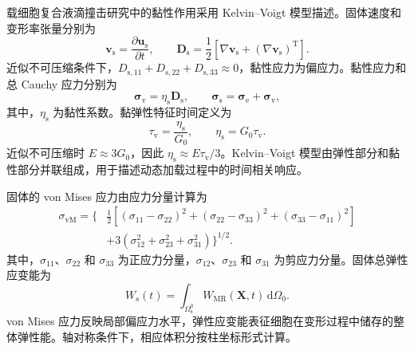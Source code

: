 载细胞复合液滴撞击研究中的黏性作用采用 Kelvin--Voigt 模型描述。固体速度和变形率张量分别为
\begin{equation}
\boldsymbol{v}_{\mathrm s}
=
\frac{\partial\boldsymbol{u}_{\mathrm s}}{\partial t},
\qquad
\boldsymbol{D}_{\mathrm s}
=
\frac{1}{2}
\left[
\nabla\boldsymbol{v}_{\mathrm s}
+
\left(\nabla\boldsymbol{v}_{\mathrm s}\right)^{\mathrm T}
\right].
\label{eq:ch2_solid_rate}
\end{equation}
近似不可压缩条件下，$D_{\mathrm s,11}+D_{\mathrm s,22}+D_{\mathrm s,33}\approx0$，黏性应力为偏应力。黏性应力和总 Cauchy 应力分别为
\begin{equation}
\boldsymbol{\sigma}_{\mathrm v}
=
\eta_{\mathrm s}\boldsymbol{D}_{\mathrm s},
\qquad
\boldsymbol{\sigma}_{\mathrm s}
=
\boldsymbol{\sigma}_{\mathrm e}
+
\boldsymbol{\sigma}_{\mathrm v},
\label{eq:ch2_kelvin_voigt_3d}
\end{equation}
其中，$\eta_{\mathrm s}$ 为黏性系数。黏弹性特征时间定义为
\begin{equation}
\tau_{\mathrm v}
=
\frac{\eta_{\mathrm s}}{G_0},
\qquad
\eta_{\mathrm s}=G_0\tau_{\mathrm v}.
\label{eq:ch2_kelvin_voigt_time}
\end{equation}
近似不可压缩时 $E\approx3G_0$，因此 $\eta_{\mathrm s}\approx E\tau_{\mathrm v}/3$。Kelvin--Voigt 模型由弹性部分和黏性部分并联组成，用于描述动态加载过程中的时间相关响应\cite{christensen1982theory,lakes1998viscoelastic}。

固体的 von Mises 应力由应力分量计算为
\begin{equation}
\begin{aligned}
\sigma_{\mathrm{vM}}
=
\Bigg\{
&\frac{1}{2}
\left[
\left(\sigma_{11}-\sigma_{22}\right)^2
+
\left(\sigma_{22}-\sigma_{33}\right)^2
+
\left(\sigma_{33}-\sigma_{11}\right)^2
\right]
\\
&+
3\left(
\sigma_{12}^2+
\sigma_{23}^2+
\sigma_{31}^2
\right)
\Bigg\}^{1/2}.
\end{aligned}
\label{eq:ch2_von_mises}
\end{equation}
其中，$\sigma_{11}$、$\sigma_{22}$ 和 $\sigma_{33}$ 为正应力分量，$\sigma_{12}$、$\sigma_{23}$ 和 $\sigma_{31}$ 为剪应力分量。固体总弹性应变能为
\begin{equation}
W_{\mathrm s}(t)
=
\int_{\Omega_{\mathrm s}^0}
W_{\mathrm{MR}}(\boldsymbol{X},t)
\,\mathrm d\Omega_0.
\label{eq:ch2_total_strain_energy}
\end{equation}
von Mises 应力反映局部偏应力水平，弹性应变能表征细胞在变形过程中储存的整体弹性能。轴对称条件下，相应体积分按柱坐标形式计算。

